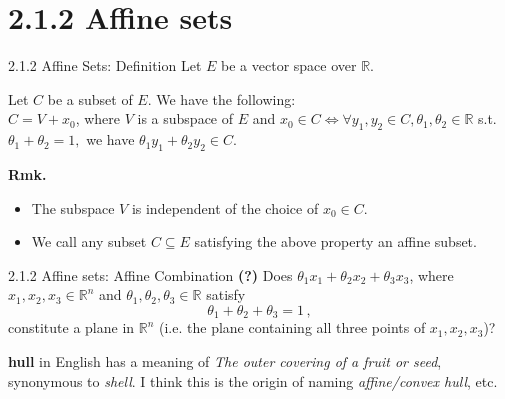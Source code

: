 \documentclass{beamer}
\begin{document}
\section{2.1.2 Affine sets}
\begin{frame}{2.1.2 Affine Sets: Definition}
  Let $E$ be a vector space over $\mathbb{R}$.
  \begin{theorem}
    Let $C$ be a subset of $E$. We have the following:\\
    \vspace{5pt}
    $C = V + x_{0}$, where $V$ is a subspace of $E$ and $x_{0} \in C \iff \forall y_{1}, y_{2}
    \in C, \theta_{1}, \theta_{2} \in \mathbb{R}$ s.t. $\theta_{1} + \theta_{2} = 1,$ we have
    $\theta_{1} y_{1} + \theta_{2} y_{2} \in C.$
  \end{theorem}

  \vspace{10pt}
  \textbf{Rmk.}
  \begin{itemize}
    \item<2-> The subspace $V$ is independent of the choice of $x_{0} \in C.$
    \item<3-> We call any subset $C \subseteq E$ satisfying the above property an affine subset.
  \end{itemize}
\end{frame}


\begin{frame}{2.1.2 Affine sets: Affine Combination}
  \textbf{(?)} Does $\theta_{1} x_{1} + \theta_{2} x_{2} + \theta_{3} x_{3}$, where $x_{1}, x_{2}, x_{3} \in \mathbb{R}^{n}$
  and $\theta_{1}, \theta_{2}, \theta_{3} \in \mathbb{R}$ satisfy
  $$
    \theta_{1} + \theta_{2} + \theta_{3} = 1\,,
  $$
  constitute a plane in $\mathbb{R}^{n}$ (i.e. the plane containing all three points of $x_{1}, x_{2}, x_{3}$)?

  \vspace{10pt}
  \textbf{hull} in English has a meaning of \textit{The outer covering of a fruit or seed}, synonymous to \textit{shell}.
  I think this is the origin of naming \textit{affine/convex hull}, etc.
\end{frame}
\end{document}
